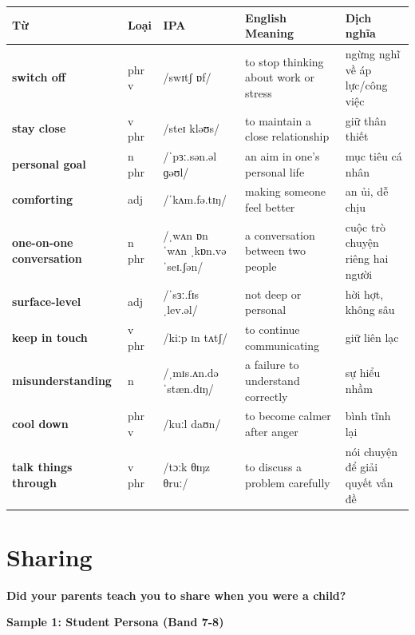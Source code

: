 \vspace{0.8em}
\begin{center}
\renewcommand{\arraystretch}{1.65}
\begin{tabularx}{\textwidth}{|V{0.22\textwidth}|C{0.07\textwidth}|I{0.20\textwidth}|Y|V{0.18\textwidth}|}
\hline
{}
\textbf{Từ} & \textbf{Loại} & \textbf{IPA} & \textbf{English Meaning} & \textbf{Dịch nghĩa} \\
\hline
\textbf{switch off} & phr v & /swɪtʃ ɒf/ & to stop thinking about work or stress & ngừng nghĩ về áp lực/công việc \\ \hline
\textbf{stay close} & v phr & /steɪ kləʊs/ & to maintain a close relationship & giữ thân thiết \\ \hline
\textbf{personal goal} & n phr & /ˈpɜː.sən.əl ɡəʊl/ & an aim in one's personal life & mục tiêu cá nhân \\ \hline
\textbf{comforting} & adj & /ˈkʌm.fə.tɪŋ/ & making someone feel better & an ủi, dễ chịu \\ \hline
\textbf{one-on-one conversation} & n phr & /ˌwʌn ɒn ˈwʌn ˌkɒn.vəˈseɪ.ʃən/ & a conversation between two people & cuộc trò chuyện riêng hai người \\ \hline
\textbf{surface-level} & adj & /ˈsɜː.fɪs ˌlev.əl/ & not deep or personal & hời hợt, không sâu \\ \hline
\textbf{keep in touch} & v phr & /kiːp ɪn tʌtʃ/ & to continue communicating & giữ liên lạc \\ \hline
\textbf{misunderstanding} & n & /ˌmɪs.ʌn.dəˈstæn.dɪŋ/ & a failure to understand correctly & sự hiểu nhầm \\ \hline
\textbf{cool down} & phr v & /kuːl daʊn/ & to become calmer after anger & bình tĩnh lại \\ \hline
\textbf{talk things through} & v phr & /tɔːk θɪŋz θruː/ & to discuss a problem carefully & nói chuyện để giải quyết vấn đề \\ \hline
\end{tabularx}
\end{center}

\newpage

\section{Sharing}
\begin{ieltsquestion}
\textbf{Did your parents teach you to share when you were a child?}
\end{ieltsquestion}
\textbf{Sample 1: Student Persona (Band 7-8)}

